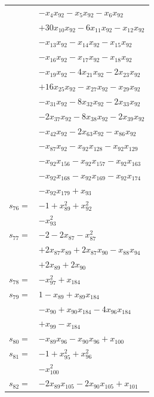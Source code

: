 \begin{longtable}{@{}r@{\;}l@{}}
 & \(\displaystyle -x_{4}x_{92} -x_{5}x_{92} -x_{6}x_{92}\) \\
 & \(\displaystyle +30x_{10}x_{92} -6x_{11}x_{92} -x_{12}x_{92}\) \\
 & \(\displaystyle -x_{13}x_{92} -x_{14}x_{92} -x_{15}x_{92}\) \\
 & \(\displaystyle -x_{16}x_{92} -x_{17}x_{92} -x_{18}x_{92}\) \\
 & \(\displaystyle -x_{19}x_{92} -4x_{21}x_{92} -2x_{23}x_{92}\) \\
 & \(\displaystyle +16x_{25}x_{92} -x_{27}x_{92} -x_{29}x_{92}\) \\
 & \(\displaystyle -x_{31}x_{92} -8x_{32}x_{92} -2x_{33}x_{92}\) \\
 & \(\displaystyle -2x_{37}x_{92} -8x_{38}x_{92} -2x_{39}x_{92}\) \\
 & \(\displaystyle -x_{42}x_{92} -2x_{63}x_{92} -x_{86}x_{92}\) \\
 & \(\displaystyle -x_{87}x_{92} -x_{92}x_{128} -x_{92}x_{129}\) \\
 & \(\displaystyle -x_{92}x_{156} -x_{92}x_{157} -x_{92}x_{163}\) \\
 & \(\displaystyle -x_{92}x_{168} -x_{92}x_{169} -x_{92}x_{174}\) \\
 & \(\displaystyle -x_{92}x_{179} +x_{93}\) \\[3pt]
\(s_{76}=\) & \(\displaystyle -1 +x_{89}^{2} +x_{92}^{2}\) \\
 & \(\displaystyle -x_{93}^{2}\) \\[3pt]
\(s_{77}=\) & \(\displaystyle -2 -2x_{87} -x_{87}^{2}\) \\
 & \(\displaystyle +2x_{87}x_{89} +2x_{87}x_{90} -x_{88}x_{94}\) \\
 & \(\displaystyle +2x_{89} +2x_{90}\) \\[3pt]
\(s_{78}=\) & \(\displaystyle -x_{97}^{2} +x_{184}\) \\[3pt]
\(s_{79}=\) & \(\displaystyle 1 -x_{89} +x_{89}x_{184}\) \\
 & \(\displaystyle -x_{90} +x_{90}x_{184} -4x_{96}x_{184}\) \\
 & \(\displaystyle +x_{99} -x_{184}\) \\[3pt]
\(s_{80}=\) & \(\displaystyle -x_{89}x_{96} -x_{90}x_{96} +x_{100}\) \\[3pt]
\(s_{81}=\) & \(\displaystyle -1 +x_{95}^{2} +x_{96}^{2}\) \\
 & \(\displaystyle -x_{100}^{2}\) \\[3pt]
\(s_{82}=\) & \(\displaystyle -2x_{89}x_{105} -2x_{90}x_{105} +x_{101}\) \\[3pt]

\end{longtable}
